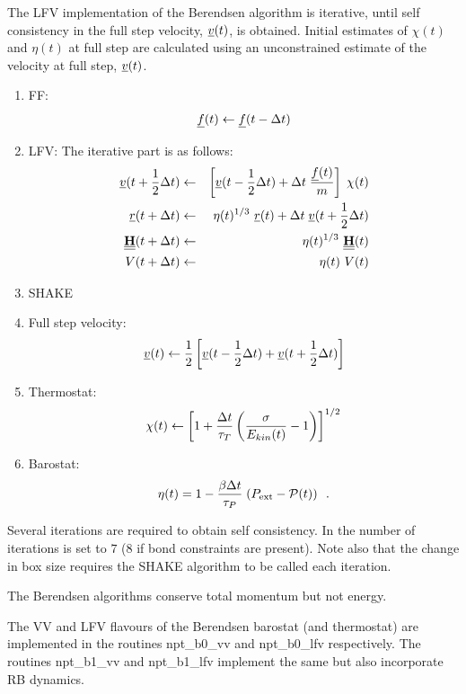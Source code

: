 The LFV implementation of the Berendsen algorithm is iterative,
until self consistency in the full step velocity, $\mbox{$\underline{v}$}(t)$,
is obtained.  Initial estimates of $\chi (t)$ and $\eta (t)$ at
full step are calculated using an unconstrained estimate of the
velocity at full step, $\mbox{$\underline{v}$}(t)$.
\begin{enumerate}
\item FF:
\begin{equation}
\mbox{$\underline{f}$}(t) \leftarrow \mbox{$\underline{f}$}(t - \Delta t)
\end{equation}
\item LFV: The iterative part is as follows:
\begin{eqnarray}
\mbox{$\underline{v}$}(t + {1 \over 2} \Delta t) &\leftarrow& \left[ \mbox{$\underline{v}$}(t -
{1 \over 2} \Delta t) + \Delta t \; {\mbox{$\underline{f}$}(t) \over m} \right] \;
\chi (t) \nonumber \\
\mbox{$\underline{r}$}(t + \Delta t) &\leftarrow& \eta (t)^{1/3}~\mbox{$\underline{r}$}(t) + \Delta t \;
\mbox{$\underline{v}$}(t + {1 \over 2} \Delta t) \\
\mbox{$\underline{\underline{\bf H}}$}(t + \Delta t) &\leftarrow&  \eta (t)^{1/3}~\mbox{$\underline{\underline{\bf H}}$}(t) \nonumber \\
V(t + \Delta t) &\leftarrow& \eta (t)~V(t) \nonumber
\end{eqnarray}
\item SHAKE
\item Full step velocity:
\begin{equation}
\mbox{$\underline{v}$}(t) \leftarrow {1 \over 2} \left[ \mbox{$\underline{v}$}(t - {1 \over 2} \Delta t) +
\mbox{$\underline{v}$}(t + {1 \over 2} \Delta t) \right]
\end{equation}
\item Thermostat:
\begin{equation}
\chi (t) \leftarrow \left[ 1 + {\Delta t \over \tau_{T}} \left(
{\sigma \over E_{kin}(t)} - 1 \right) \right]^{1/2}
\end{equation}
\item Barostat:
\begin{equation}
\eta (t) = 1 - {\beta \Delta t \over \tau_{P}} \; (P_{\rm ext} -
{\cal P}(t))~~.
\end{equation}
\end{enumerate}
Several iterations are required to obtain self consistency.  In \D
the number of iterations is set to $7$ ($8$ if bond constraints
are present).  Note also that the change in box size requires the
SHAKE algorithm to be called each iteration.

The Berendsen algorithms conserve total momentum but not energy.

The VV and LFV flavours of the Berendsen barostat (and thermostat) are implemented
in the \D routines {\sc npt\_b0\_vv} and {\sc npt\_b0\_lfv} respectively.
The routines {\sc npt\_b1\_vv} and {\sc npt\_b1\_lfv} implement the
same but also incorporate RB dynamics.

